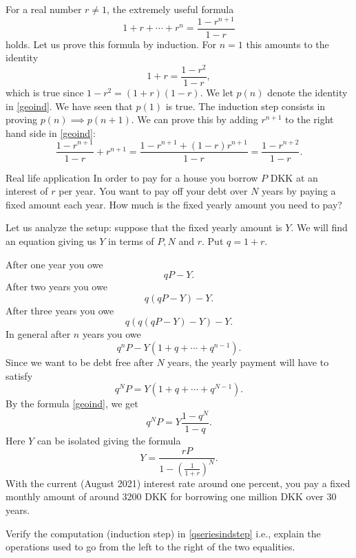 \begin{example}\label{examplegeomseries}
  For a real number $r\neq 1$, the extremely useful formula
  \begin{equation}\label{geoind}
    1 + r + \cdots + r^n = \frac{1 - r^{n+1}}{1-r}
  \end{equation}
  holds. Let us prove this formula by induction. For $n=1$ this amounts to the identity
  $$
    1 + r = \frac{1-r^2}{1-r},
  $$
  which is true since $1-r^2 = (1+r)(1-r)$. We let $p(n)$ denote
  the identity in \eqref{geoind}. We have seen that $p(1)$ is true. The induction step
  consists in proving $p(n)\implies p(n+1)$. We can prove this
  by adding $r^{n+1}$ to the right hand side in \eqref{geoind}:
  \begin{equation}\label{qseriesindstep}
    \frac{1 - r^{n+1}}{1-r} + r^{n+1} = \frac{1 - r^{n+1} + (1-r) r^{n+1}}{1-r} = \frac{1 - r^{n+2}}{1-r}.
  \end{equation}
  \begin{button}{Real life application}
    In order to pay for a house you borrow $P$ DKK at an interest of
    $r$ per year. You want to pay off your debt over $N$ years by
    paying a fixed amount each year. How much is the fixed yearly
    amount you need to pay?

    Let us analyze the setup: suppose that the fixed yearly amount
    is $Y$. We will find an equation giving us $Y$ in terms of
    $P, N$ and $r$. Put $q = 1+ r$.

    After one year you owe
    $$
      q P - Y.
    $$
    After two years you owe
    $$
      q(q P - Y) - Y.
    $$
    After three years you owe
    $$
      q ( q ( q P - Y) - Y) - Y.
    $$
    In general after $n$ years you owe
    $$
      q^n P - Y (1 + q + \cdots + q^{n-1}).
    $$
    Since we want to be debt free after $N$ years, the yearly payment will have to satisfy
    $$
      q^N P = Y ( 1 + q + \cdots + q^{N-1}).
    $$
    By the formula \eqref{geoind}, we get
    $$
      q^N P = Y \frac{1-q^N}{1-q}.
    $$
    Here $Y$ can be isolated giving the formula
    $$
      Y = \frac{r P}{1 - \left(\frac{1}{1+r}\right)^N}.
    $$
    With the current (August 2021) interest rate around one percent, you pay a fixed monthly
    amount of around 3200 DKK for borrowing one million DKK over $30$ years.
  \end{button}
\end{example}

\begin{exercise}
  Verify the computation (induction step) in \eqref{qseriesindstep} i.e., explain
  the operations used to go from the left to the right of the two equalities.
\end{exercise}

